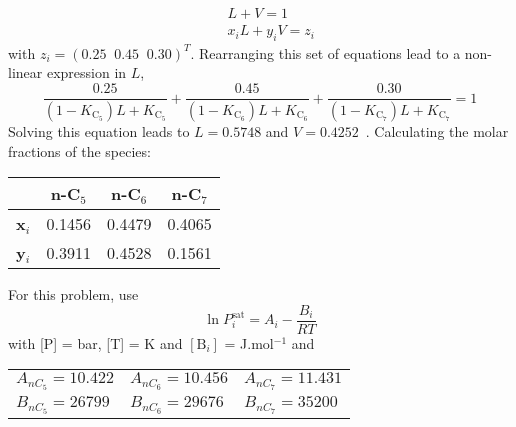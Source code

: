 \documentclass[calculator,allquestions,datasheet,solutions]{exam_newMarcus2}
\newcommand{\frc}{\displaystyle\frac}
\begin{document}
\begin{question}
\begin{enumerate}[(a)]
{\begin{eqnarray}
&& L + V = 1 \nonumber \\
&& x_{i}L + y_{i}V = z_{i} \nonumber 
\end{eqnarray}
with $z_{i}=\left(0.25\;\;0.45\;\;0.30\right)^{T}$. Rearranging this set of equations lead to a non-linear expression in $L$,~
\begin{displaymath}
\frc{0.25}{\left(1-K_{\text{C}_{5}}\right)L+K_{\text{C}_{5}}} + \frc{0.45}{\left(1-K_{\text{C}_{6}}\right)L+K_{\text{C}_{6}}} +  \frc{0.30}{\left(1-K_{\text{C}_{7}}\right)L+K_{\text{C}_{7}}} = 1 
\end{displaymath}
Solving this equation leads to $L=0.5748$ and $V=0.4252$~. Calculating the molar fractions of the species:~
\begin{center}
\begin{tabular}{c c c c}
\hline
                 & {\bf n-C$_{5}$} &  {\bf n-C$_{6}$} &  {\bf n-C$_{7}$} \\
\hline
  {\bf x$_{i}$}   & 0.1456         &  0.4479         & 0.4065    \\
  {\bf y$_{i}$}   &  0.3911        &  0.4528         & 0.1561    \\
\hline
\end{tabular} 
\end{center}}

%
\end{enumerate}

For this problem, use 
\begin{displaymath}
   \ln P_{i}^{\text{sat}} = A_{i} - \frc{B_{i}}{RT}
\end{displaymath} 
with [P] = bar, [T] = K and $\left[\text{B}_{i}\right]$ = J.mol$^{-1}$ and
    \begin{center}
       \begin{tabular}{l l l} 
          $A_{nC_{5}}=10.422$ & $A_{nC_{6}}=10.456$ & $A_{nC_{7}}=11.431$ \\
          $B_{nC_{5}}=26799$  & $B_{nC_{6}}=29676$  & $B_{nC_{7}}=35200$  
       \end{tabular}
    \end{center}
%
\end{question}

\clearpage
\end{document}
